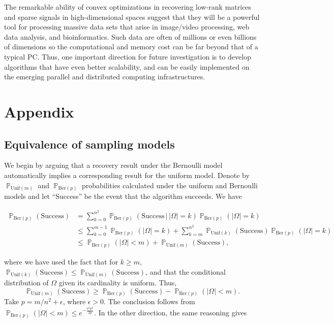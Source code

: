 The remarkable ability of convex optimizations in recovering low-rank matrices and sparse signals in high-dimensional spaces suggest that they will be a powerful tool for processing massive data sets that arise in  image/video processing, web data analysis, and bioinformatics. Such data are often of millions or even billions of dimensions so the computational and memory cost can be far beyond that of a typical PC. Thus, one important direction for future investigation is to develop algorithms that have even better scalability, and can be easily implemented on the emerging parallel and distributed computing infrastructures.

\section{Appendix}
\label{sec:appendix}

\subsection{Equivalence of sampling models}

We begin by arguing that a recovery result under the Bernoulli model automatically implies a corresponding result for the uniform model. Denote by $\operatorname{\mathbb{P}}_{\text{Unif}(m)}$ and $\operatorname{\mathbb{P}}_{\text{Ber}(p)}$
probabilities calculated under the uniform and Bernoulli models and let ``Success'' be the event that the algorithm succeeds. We have

\begin{align*}
  \operatorname{\mathbb{P}}_{\text{Ber}(p)}(\text{Success}) & = \sum_{k = 0}^{n^2} \operatorname{\mathbb{P}}_{\text{Ber}(p)}(\text{Success} \, | \, |\Omega| = k) \operatorname{\mathbb{P}}_{\text{Ber}(p)}(|\Omega| = k)\\
  & \le \sum_{k = 0}^{m-1} \operatorname{\mathbb{P}}_{\text{Ber}(p)}(|\Omega| = k) + \sum_{k
    = m}^{n^2}
  \operatorname{\mathbb{P}}_{\text{Unif}(k)}(\text{Success}) \operatorname{\mathbb{P}}_{\text{Ber}(p)}(|\Omega| = k)\\
  & \le \operatorname{\mathbb{P}}_{\text{Ber}(p)}(|\Omega| < m) +
  \operatorname{\mathbb{P}}_{\text{Unif}(m)}(\text{Success}),
\end{align*}

where we have used the fact that for $k \ge m$, $\operatorname{\mathbb{P}}_{\text{Unif}(k)}(
\text{Success} ) \le \operatorname{\mathbb{P}}_{\text{Unif}(m)}( \text{Success} )$, and that the conditional distribution of $\Omega$ given its cardinality is uniform. Thus, 
\[
\operatorname{\mathbb{P}}_{\text{Unif}(m)} (\text{Success}) \ge
\operatorname{\mathbb{P}}_{\text{Ber}(p)}(\text{Success}) - \operatorname{\mathbb{P}}_{\text{Ber}(p)}(|\Omega| < m). 
\]
Take $p = m/n^2 + \epsilon$, where $\epsilon > 0$. The conclusion follows from $\operatorname{\mathbb{P}}_{\text{Ber}(p)}(|\Omega| < m) \le
e^{-\frac{\epsilon^2n^2}{2p}}$.  In the other direction, the same reasoning gives

